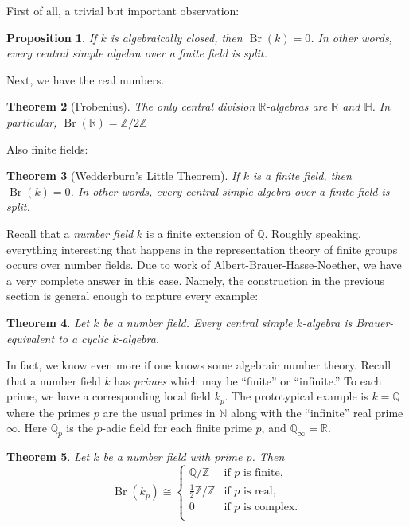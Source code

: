 \documentclass[12pt]{article}
\theoremstyle{plain}
\newtheorem{theorem}{Theorem}[section]
\newtheorem{proposition}[theorem]{Proposition}
\theoremstyle{definition}
\theoremstyle{remark}
\numberwithin{equation}{section}
\begin{document}
First of all, a trivial but important observation:

\begin{proposition}
If $k$ is algebraically closed, then $\operatorname{Br}(k)=0$.
In other words, every central simple algebra over a finite field is split. 
\end{proposition}

Next, we have the real numbers.

\begin{theorem}[Frobenius]
The only central division $\mathbb{R}$-algebras are
$\mathbb{R}$ and $\mathbb{H}$.
In particular, $\operatorname{Br}(\mathbb{R})=\mathbb{Z}/2\mathbb{Z}$
\end{theorem}

Also finite fields:

\begin{theorem}[Wedderburn's Little Theorem]
If $k$ is a finite field, then $\operatorname{Br}(k)=0$.
In other words, every central simple algebra over a finite field is split.
\end{theorem}

Recall that a \emph{number field} $k$ is a finite extension of
$\mathbb{Q}$.  Roughly speaking, everything interesting that happens in
the representation theory of finite groups occurs over number fields.
Due to work of Albert-Brauer-Hasse-Noether, we have a very complete
answer in this case.  Namely, the construction in the previous section
is general enough to capture every example:

\begin{theorem}
Let $k$ be a number field.
Every central simple $k$-algebra is Brauer-equivalent to a cyclic
$k$-algebra.
\end{theorem}

In fact, we know even more if one knows some algebraic number theory.
Recall that a number field $k$ has \emph{primes}
which may be ``finite'' or ``infinite.''
To each prime, we have a corresponding local field $k_p$.
The prototypical example is $k=\mathbb{Q}$ where the primes $p$ are the
usual primes in $\mathbb{N}$ along with the ``infinite'' real prime
$\infty$.  Here $\mathbb{Q}_p$ is the $p$-adic field for each finite
prime $p$, and $\mathbb{Q}_\infty = \mathbb{R}$.

\begin{theorem}
Let $k$ be a number field with prime $p$.  Then
\[
\operatorname{Br}(k_p) \cong
\begin{cases}
\mathbb{Q}/\mathbb{Z} & \textrm{if $p$ is finite,}\\
\frac{1}{2}\mathbb{Z}/\mathbb{Z} & \textrm{if $p$ is real,}\\
0 & \textrm{if $p$ is complex.}\\
\end{cases}
\]
\end{theorem}
\end{document}
